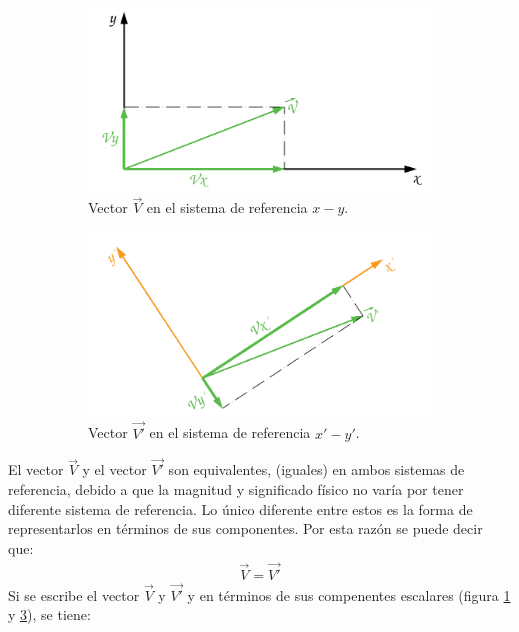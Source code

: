 \documentclass[12pt,letterpaper]{article}
\begin{document}

\begin{figure}[H]
	\centering
	\begin{subfigure}[l]{0.450\textwidth}
		\includegraphics[width=\textwidth]{img/Vector1Componentes.pdf}
		\caption{Vector $\overset{\rightarrow}{V}$ en el sistema de referencia $x-y$.}
		\label{vector1comp}
	\end{subfigure}
	\hspace{.5 cm}
	\begin{subfigure}[r]{0.450\textwidth}
		\includegraphics[width=\textwidth]{img/Vector2Componentes.pdf}
		\caption{Vector $\overset{\rightarrow}{V'}$ en el sistema de referencia $x'-y'$.}
		\label{vector2comp}
	\end{subfigure}	
	\caption{}
\end{figure}
%
%
El vector $\overset{\rightarrow}{V}$ y el vector $\overset{\rightarrow}{V'}$ son equivalentes, (iguales) en ambos sistemas de referencia, debido a que la magnitud y significado físico no varía por tener diferente sistema de referencia. Lo único diferente entre estos es la forma de representarlos en términos de sus componentes. Por esta razón se puede decir que:
%
\begin{align}
	\overset{\rightarrow}{V} = \overset{\rightarrow}{V'}
	\label{uno}
\end{align}
%
Si se escribe el vector $\overset{\rightarrow}{V}$  y  $\overset{\rightarrow}{V'}$ y en términos de sus compenentes escalares (figura \ref{vector1comp} y \ref{vector2comp}), se tiene: 
\end{document}

